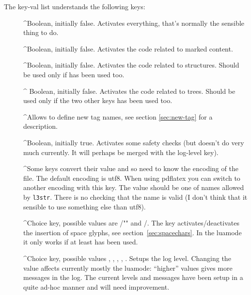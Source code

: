 \documentclass[DIV=12,parskip=half-,bibliography=totoc]{scrartcl}
\begin{document}
\TagP The key-val list understands the following keys:\TagPend
\begin{description}
\item[]
 \TagP^Boolean, initially false. Activates everything, that's normally the sensible thing to do.\Pmeti
\item[]
 \TagP^Boolean, initially false. Activates the code related to marked content.\Pmeti
\item[]
 \TagP^Boolean, initially false. Activates the code related to structures. Should be used only if  has been used too.\Pmeti
\item[]
\TagP^ Boolean, initially false. Activates the code related to trees. Should be used only if the two other keys has been used too.\Pmeti
\item[]
 \TagP^Allows to define new tag names, see section \ref{sec:new-tag} for a description.\Pmeti
\item[]
 \TagP^Boolean, initially true. Activates some safety checks (but doesn't do very much currently. It will perhaps be merged with the log-level key).\Pmeti
\item[]
 \TagP^Some keys convert their value and so need to know the encoding of the file. The default encoding is utf8.  When using pdflatex you can switch to another encoding with this key. The value should be one of names allowed by \texttt{l3str}. There is no checking that the name is valid (I don't think that it sensible to use something else than utf8).
 \Pmeti
\item[]
 \TagP^Choice key, possible values are /"" and /. The key activates/deactivates the insertion of space glyphs, see section~\ref{sec:spacechars}. In the luamode it only works if at least  has been used.\Pmeti
\item[]
 \TagP^Choice key, possible values , , , ,  .  Setups the log level.  Changing the value affects currently mostly the luamode: \enquote{higher} values gives more messages in the log. The current levels and messages have been setup in a quite ad-hoc manner and will need improvement.\Pmeti
\item[]

\end{description}
\end{document}
